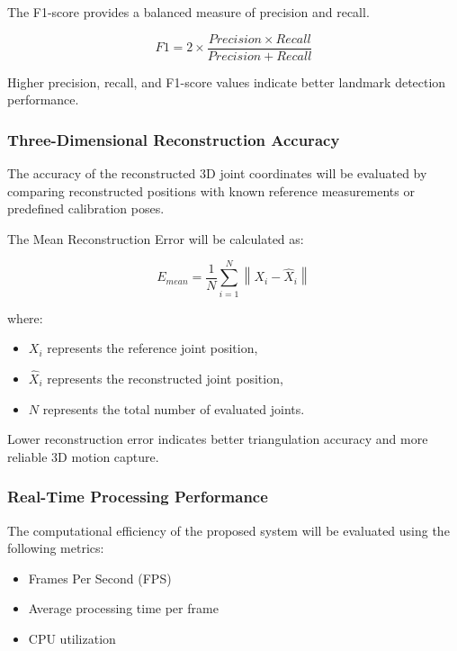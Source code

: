 The F1-score provides a balanced measure of precision and recall.

\begin{equation}
F1 = 2 \times \frac{Precision \times Recall}{Precision + Recall}
\end{equation}

Higher precision, recall, and F1-score values indicate better landmark detection performance.

\subsubsection{Three-Dimensional Reconstruction Accuracy}

The accuracy of the reconstructed 3D joint coordinates will be evaluated by comparing reconstructed positions with known reference measurements or predefined calibration poses.

The Mean Reconstruction Error will be calculated as:

\begin{equation}
E_{mean} = \frac{1}{N}\sum_{i=1}^{N}\left\|X_i-\hat{X}_i\right\|
\end{equation}

where:
\begin{itemize}
    \item $X_i$ represents the reference joint position,
    \item $\hat{X}_i$ represents the reconstructed joint position,
    \item $N$ represents the total number of evaluated joints.
\end{itemize}

Lower reconstruction error indicates better triangulation accuracy and more reliable 3D motion capture.

\subsubsection{Real-Time Processing Performance}

The computational efficiency of the proposed system will be evaluated using the following metrics:

\begin{itemize}
    \item Frames Per Second (FPS)
    \item Average processing time per frame
    \item CPU utilization
\end{itemize}

